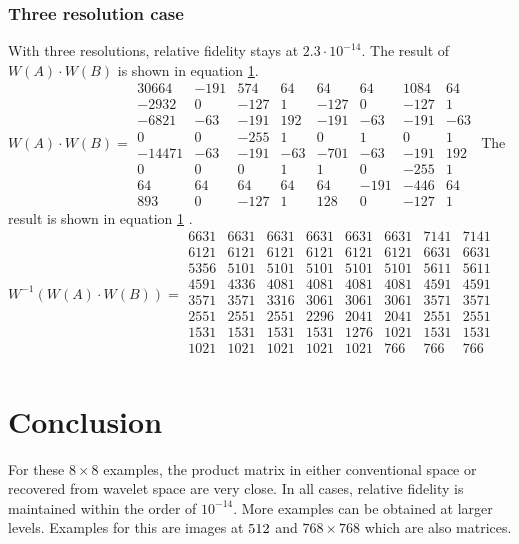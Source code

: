 \documentclass{article}
\begin{document}
\subsubsection {Three resolution case}
With three resolutions, relative fidelity stays at  $2.3 \cdot 10^{-14}$.  The result of $W(A)\cdot  W(B)$ is shown in equation \ref{}.\\
$ W(A) \cdot W(B) =
\begin{array}{cccccccc}
30664 & -191 & 574 & 64 & 64 & 64 & 1084 & 64\\
-2932 & 0 & -127 & 1 & -127 & 0 & -127 & 1\\
-6821 & -63 & -191 & 192 & -191 & -63 & -191 & -63\\
0 & 0 & -255 & 1 & 0 & 1 & 0 & 1\\
-14471 & -63 & -191 & -63 & -701 & -63 & -191 & 192\\
0 & 0 & 0 & 1 & 1 & 0 & -255 & 1\\
64 & 64 & 64 & 64 & 64 & -191 & -446 & 64\\
893 & 0 & -127 & 1 & 128 & 0 & -127 & 1
\end{array}
$
The result is shown in equation \ref{} .\\
$ W^{-1}(W(A) \cdot W(B)) =
\begin{array}{cccccccc}
6631 & 6631 & 6631 & 6631 & 6631 & 6631 & 7141 & 7141\\
6121 & 6121 & 6121 & 6121 & 6121 & 6121 & 6631 & 6631\\
5356 & 5101 & 5101 & 5101 & 5101 & 5101 & 5611 & 5611\\
4591 & 4336 & 4081 & 4081 & 4081 & 4081 & 4591 & 4591\\
3571 & 3571 & 3316 & 3061 & 3061 & 3061 & 3571 & 3571\\
2551 & 2551 & 2551 & 2296 & 2041 & 2041 & 2551 & 2551\\
1531 & 1531 & 1531 & 1531 & 1276 & 1021 & 1531 & 1531\\
1021 & 1021 & 1021 & 1021 & 1021 & 766 & 766 & 766\\
\end{array}
$

\section {Conclusion}
For these $8\times 8$ examples, the product matrix in either conventional space or recovered from wavelet space are very close.  In all cases, relative fidelity is maintained within the order of $10^{-14}$.  More examples can be obtained at larger levels.  Examples for this are images at $512 \time 512$ and $768\times 768$ which are also matrices.  
\end{document}
